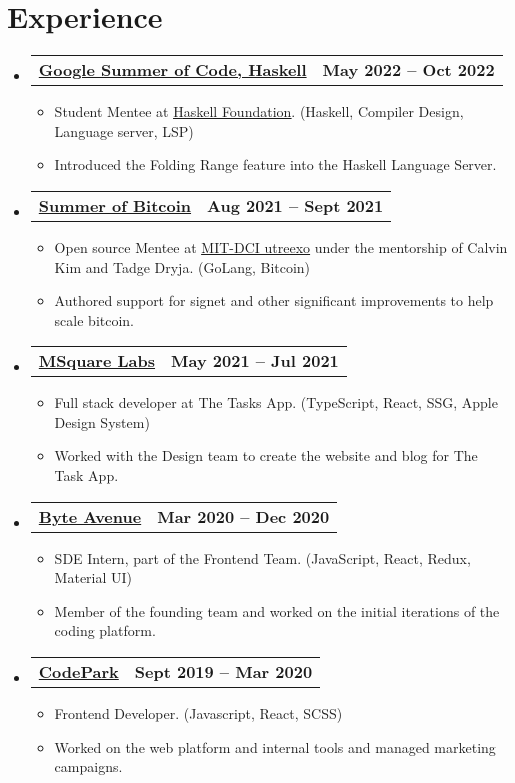 \documentclass[a4paper,11pt]{article}
\makeatletter
\newcommand{\resumeItem}[1]{
  \item\small{
    {#1 \vspace{-2pt}}
  }
}
\newcommand{\resumeSubheadingg}[2]{
  \vspace{-2pt}\item
    \begin{tabular*}{1.0\textwidth}[t]{l@{\extracolsep{\fill}}r}
      \textbf{#1} & \textbf{\small #2} \\
    \end{tabular*}\vspace{-7pt}
}
\newcommand{\resumeSubHeadingListStart}{\begin{itemize}[leftmargin=0.0in, label={}]}
\newcommand{\resumeSubHeadingListEnd}{\end{itemize}}
\newcommand{\resumeItemListStart}{\begin{itemize}}
\newcommand{\resumeItemListEnd}{\end{itemize}\vspace{-5pt}}
\makeatother
\begin{document}
\section{Experience}
  \resumeSubHeadingListStart

 \resumeSubheadingg
      {\href{https://summerofcode.withgoogle.com/}{Google Summer of Code, Haskell}}{May 2022 -- Oct 2022}
      \resumeItemListStart
        \resumeItem{Student Mentee at \underline{\href{https://www.github.com/haskell}{Haskell Foundation}}. (Haskell, Compiler Design, Language server, LSP)}
        \resumeItem{Introduced the Folding Range feature into the Haskell Language Server.}
    \resumeItemListEnd

    \resumeSubheadingg
      {\href{https://www.summerofbitcoin.org/}{Summer of Bitcoin}}{Aug 2021 -- Sept 2021}
      \resumeItemListStart
        \resumeItem{Open source Mentee at \underline{\href{https://www.github.com/utreexo}{MIT-DCI utreexo}} under the mentorship of Calvin Kim and Tadge Dryja. (GoLang, Bitcoin)}
        \resumeItem{Authored support for signet and other significant improvements to help scale bitcoin.}
    \resumeItemListEnd

  \resumeSubheadingg
      {\href{https://twitter.com/thetaskapp}{MSquare Labs}}{May 2021 -- Jul 2021}
      \resumeItemListStart
        \resumeItem{Full stack developer at The Tasks App. (TypeScript, React, SSG, Apple Design System)}
        \resumeItem{Worked with the Design team to create the website and blog for The Task App.}
    \resumeItemListEnd

    \resumeSubheadingg
      {\href{https://byteavenue.org}{Byte Avenue}}{Mar 2020 -- Dec 2020}
      \resumeItemListStart
        \resumeItem{SDE Intern, part of the Frontend Team. (JavaScript, React, Redux, Material UI)}
        \resumeItem{Member of the founding team and worked on the initial iterations of the coding platform.}
    \resumeItemListEnd
    
    \resumeSubheadingg
      {\href{https://byteavenue.org}{CodePark}}{Sept 2019 -- Mar 2020}
      \resumeItemListStart
        \resumeItem{Frontend Developer. (Javascript, React, SCSS)}
        \resumeItem{Worked on the web platform and internal tools and managed marketing campaigns.}
    \resumeItemListEnd
    
  \resumeSubHeadingListEnd
\vspace{-16pt}
\end{document}
